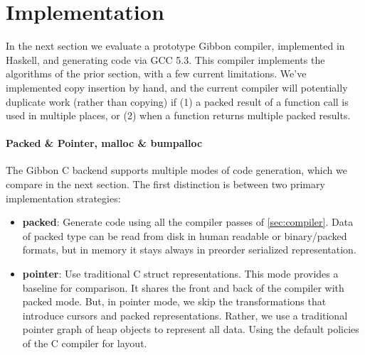 \documentclass[a4paper,english]{lipics-v2016}
\newcommand{\treelang}{Gibbon\xspace} %
\begin{document}




\section{Implementation}\label{sec:impl}

In the next section we evaluate a prototype \treelang compiler, implemented in
Haskell, and generating code via GCC 5.3.  
%
This compiler implements the algorithms of the prior section, with a few current
limitations.  We've implemented copy insertion by hand, and the current compiler
will potentially duplicate work (rather than copying) if (1) a packed result of a
function call is used in multiple places, or (2) when a function returns multiple
packed results.

\paragraph*{Packed \& Pointer, malloc \& bumpalloc}

The \treelang C backend supports multiple modes of code generation, which we
compare in the next section.  The first distinction is between two primary
implementation strategies:

\begin{itemize}
\item {\bf packed}: Generate code using all the compiler passes of
  \cref{sec:compiler}.  Data of packed type can be read from disk in human
  readable or binary/packed formats, but in memory it stays always in preorder
  serialized representation.
\item {\bf pointer}: Use traditional C struct representations.  This mode
  provides a baseline for comparison.  It shares the front and back of the
  compiler with packed mode.  But, in pointer mode, we skip the transformations
  that introduce cursors and packed representations.  Rather, we use a
  traditional pointer graph of heap objects to represent all data.  Using the
  default policies of the C compiler for  layout.
\end{itemize}
\end{document}
